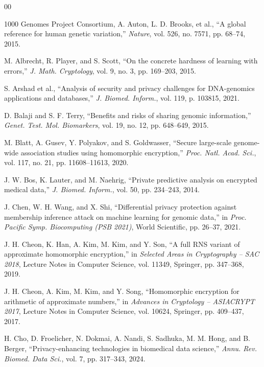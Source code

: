 \documentclass[conference]{IEEEtran}
\begin{document}
\begin{thebibliography}{00}

1000 Genomes Project Consortium, A. Auton, L. D. Brooks, et al., ``A global
reference for human genetic variation,'' \textit{Nature}, vol. 526, no. 7571,
pp. 68--74, 2015.

M. Albrecht, R. Player, and S. Scott, ``On the concrete hardness of learning
with errors,'' \textit{J. Math. Cryptology}, vol. 9, no. 3, pp. 169--203, 2015.

S. Arshad et al., ``Analysis of security and privacy challenges for
DNA-genomics applications and databases,'' \textit{J. Biomed. Inform.},
vol. 119, p. 103815, 2021.

D. Balaji and S. F. Terry, ``Benefits and risks of sharing genomic
information,'' \textit{Genet. Test. Mol. Biomarkers}, vol. 19, no. 12,
pp. 648--649, 2015.

M. Blatt, A. Gusev, Y. Polyakov, and S. Goldwasser, ``Secure large-scale
genome-wide association studies using homomorphic encryption,''
\textit{Proc. Natl. Acad. Sci.}, vol. 117, no. 21, pp. 11608--11613, 2020.

J. W. Bos, K. Lauter, and M. Naehrig, ``Private predictive analysis on
encrypted medical data,'' \textit{J. Biomed. Inform.}, vol. 50, pp. 234--243,
2014.

J. Chen, W. H. Wang, and X. Shi, ``Differential privacy protection against
membership inference attack on machine learning for genomic data,'' in
\textit{Proc. Pacific Symp. Biocomputing (PSB 2021)}, World Scientific,
pp. 26--37, 2021.

J. H. Cheon, K. Han, A. Kim, M. Kim, and Y. Son, ``A full RNS variant of
approximate homomorphic encryption,'' in \textit{Selected Areas in
Cryptography -- SAC 2018}, Lecture Notes in Computer Science, vol. 11349,
Springer, pp. 347--368, 2019.

J. H. Cheon, A. Kim, M. Kim, and Y. Song, ``Homomorphic encryption for
arithmetic of approximate numbers,'' in \textit{Advances in Cryptology --
ASIACRYPT 2017}, Lecture Notes in Computer Science, vol. 10624, Springer,
pp. 409--437, 2017.

H. Cho, D. Froelicher, N. Dokmai, A. Nandi, S. Sadhuka, M. M. Hong, and
B. Berger, ``Privacy-enhancing technologies in biomedical data science,''
\textit{Annu. Rev. Biomed. Data Sci.}, vol. 7, pp. 317--343, 2024.


\end{thebibliography}
\end{document}
